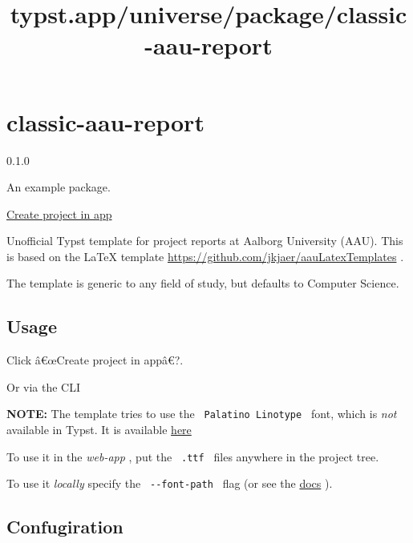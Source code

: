\title{typst.app/universe/package/classic-aau-report}

\label{banner}
\label{template-thumbnail}

\section{classic-aau-report}\label{classic-aau-report}

{ 0.1.0 }

An example package.

\href{/app?template=classic-aau-report&version=0.1.0}{Create project in
app}

\label{readme}
Unofficial Typst template for project reports at Aalborg University
(AAU). This is based on the LaTeX template
\url{https://github.com/jkjaer/aauLatexTemplates} .

The template is generic to any field of study, but defaults to Computer
Science.

\subsection{Usage}\label{usage}

Click â€œCreate project in appâ€?.

Or via the CLI

\begin{Shaded}
\begin{Highlighting}[]
\end{Highlighting}
\end{Shaded}

\textbf{NOTE:} The template tries to use the
\texttt{\ Palatino\ Linotype\ } font, which is \emph{not} available in
Typst. It is available
\href{https://github.com/Tinggaard/classic-aau-report/tree/main/fonts}{here}

To use it in the \emph{web-app} , put the \texttt{\ .ttf\ } files
anywhere in the project tree.

To use it \emph{locally} specify the \texttt{\ -\/-font-path\ } flag (or
see the
\href{https://typst.app/docs/reference/text/text/\#parameters-font}{docs}
).

\subsection{Confugiration}\label{confugiration}

